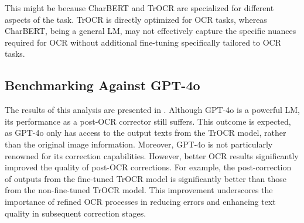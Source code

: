 This might be because CharBERT and TrOCR are specialized for different aspects of the task. TrOCR is directly optimized for OCR tasks, whereas CharBERT, being a general LM, may not effectively capture the specific nuances required for OCR without additional fine-tuning specifically tailored to OCR tasks.


\subsection{Benchmarking Against GPT-4o}
\label{subsec:5_benchmarking_against_gpt-4}
The results of this analysis are presented in . Although GPT-4o is a powerful LM, its performance as a post-OCR corrector still suffers. This outcome is expected, as GPT-4o only has access to the output texts from the TrOCR model, rather than the original image information. Moreover, GPT-4o is not particularly renowned for its correction capabilities. However, better OCR results significantly improved the quality of post-OCR corrections. For example, the post-correction of outputs from the fine-tuned TrOCR model is significantly better than those from the non-fine-tuned TrOCR model. This improvement underscores the importance of refined OCR processes in reducing errors and enhancing text quality in subsequent correction stages.


